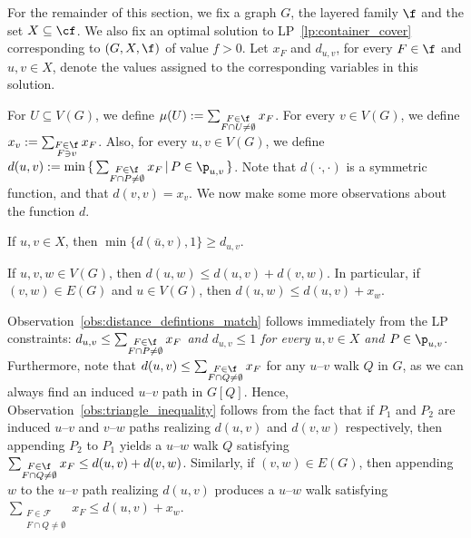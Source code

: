 For the remainder of this section, we fix a graph $G$, the layered family $\f$ and the set $X\subseteq \cf$. We also fix an optimal solution to LP~\ref{lp:container_cover} corresponding to $(G, X, \f)$ of value $f>0$. Let $x_F$ and $d_{u,v}$, for every $F \in \f$ and $u,v\in X$, denote the values assigned to the corresponding variables in this solution.


For $U \subseteq V(G)$, we define $\mu(U) := \sum_{\substack{F \in \f \\ F \cap U \neq \emptyset}} x_F$. 
%
For every $v \in V(G)$, we define $x_v := \sum_{\substack{F \in \f \\ F \ni v}} x_F$. Also, for every $u, v \in V(G)$, we define $d(u,v) := \min\,\{\, \sum_{\substack{F \in \f \\ F \cap P \neq \emptyset}} x_F \,|\, P \in \p_{u,v}\, \}$.%
Note that $d(\cdot,\cdot)$ is a symmetric function, and that $d(v,v)=x_v$. We now make some more observations about the function $d$.

\begin{observation}\label{obs:distance_defintions_match}
    If $u, v \in X$, then $\min\{d(\bar{u}, v),1\} \geq d_{u,v}$.
\end{observation}

\begin{observation}\label{obs:triangle_inequality}
    If $u,v,w \in V(G)$, then $d(u,w) \leq d(u,v) + d(v,w)$. In particular, if $(v,w) \in E(G)$ and $u \in V(G)$, then $d(u,w) \leq d(u,v) + x_w$. 
\end{observation}

Observation~\ref{obs:distance_defintions_match} follows immediately from the LP constraints: \emph{$d_{u,v} \leq \sum_{\substack{F\in \f\\ F\cap P \neq\emptyset}} x_F$ and $d_{u,v} \leq 1$ for every $u,v\in X$ and $P\in\p_{u,v}$}. Furthermore, note that $d(u,v) \leq \sum_{\substack{F \in \f \\ F \cap Q \neq \emptyset}} x_F$ for any $u$--$v$ walk $Q$ in $G$, as we can always find an induced $u$--$v$ path in $G[Q]$. Hence, Observation~\ref{obs:triangle_inequality} follows from the fact that if $P_1$ and $P_2$ are induced $u$--$v$ and $v$--$w$ paths realizing $d(u,v)$ and $d(v,w)$ respectively, then appending $P_2$ to $P_1$ yields a $u$--$w$ walk $Q$ satisfying $\sum_{\substack{F \in \f \\ F \cap Q \neq \emptyset}} x_F \leq d(u,v) + d(v,w)$. Similarly, if $(v,w) \in E(G)$, then appending $w$ to the $u$--$v$ path realizing $d(u,v)$ produces a $u$--$w$ walk satisfying $\sum_{\substack{F \in \mathcal{F} \\ F \cap Q \neq \emptyset}} x_F \leq d(u,v) + x_w$.\\

